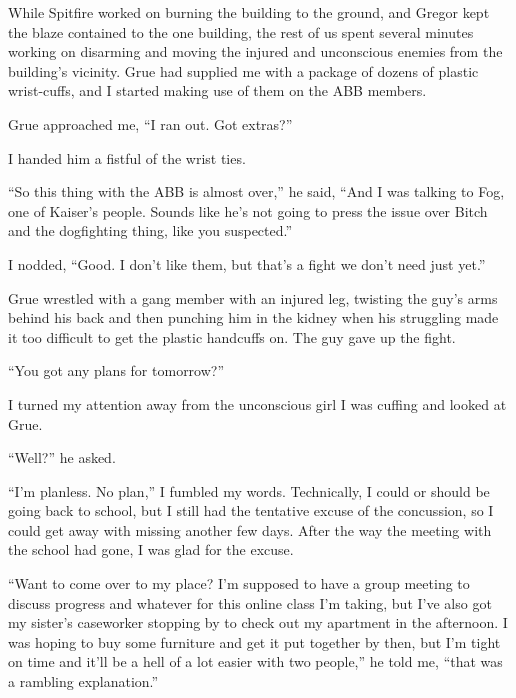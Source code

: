 While Spitfire worked on burning the building to the ground, and Gregor kept the blaze contained to the one building, the rest of us spent several minutes working on disarming and moving the injured and unconscious enemies from the building's vicinity.  Grue had supplied me with a package of dozens of plastic wrist-cuffs, and I started making use of them on the ABB members.



Grue approached me, ``I ran out.  Got extras?''



I handed him a fistful of the wrist ties.



``So this thing with the ABB is almost over,'' he said, ``And I was talking to Fog, one of Kaiser's people.  Sounds like he's not going to press the issue over Bitch and the dogfighting thing, like you suspected.''



I nodded, ``Good.  I don't like them, but that's a fight we don't need just yet.''



Grue wrestled with a gang member with an injured leg, twisting the guy's arms behind his back and then punching him in the kidney when his struggling made it too difficult to get the plastic handcuffs on.  The guy gave up the fight.



``You got any plans for tomorrow?''



I turned my attention away from the unconscious girl I was cuffing and looked at Grue.



``Well?'' he asked.



``I'm planless.  No plan,'' I fumbled my words.  Technically, I could or should be going back to school, but I still had the tentative excuse of the concussion, so I could get away with missing another few days.  After the way the meeting with the school had gone, I was glad for the excuse.



``Want to come over to my place?  I'm supposed to have a group meeting to discuss progress and whatever for this online class I'm taking, but I've also got my sister's caseworker stopping by to check out my apartment in the afternoon.  I was hoping to buy some furniture and get it put together by then, but I'm tight on time and it'll be a hell of a lot easier with two people,'' he told me, ``\ldotsand that was a rambling explanation.''



